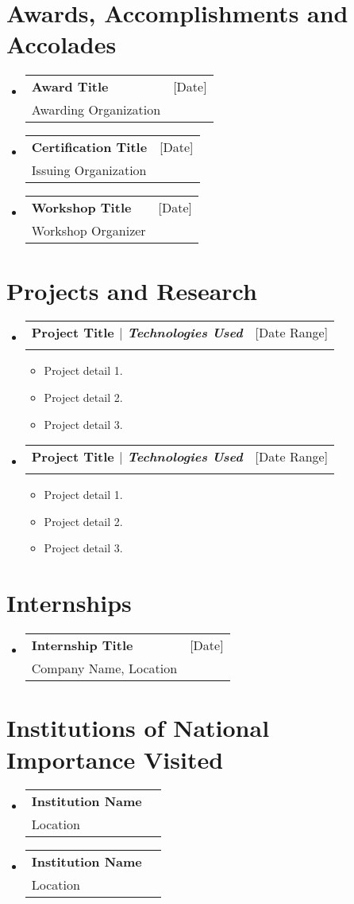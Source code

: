 \documentclass[A4,11pt]{article}
\makeatletter
\newcommand{\CVItem}[1]{
	\item\small{
		{#1 \vspace{-2pt}}
	}
}
\newcommand{\CVSubheading}[4]{
	\vspace{-2pt}\item
	\begin{tabular*}{0.97\textwidth}[t]{l@{\extracolsep{\fill}}r}
		\textbf{#1} & #2 \\
		\small#3 & \small #4 \\
	\end{tabular*}\vspace{-7pt}
}
\newcommand{\CVSubHeadingListStart}{\begin{itemize}[leftmargin=0.5cm, label={}]}
\newcommand{\CVSubHeadingListEnd}{\end{itemize}}
\newcommand{\CVItemListStart}{\begin{itemize}}
\newcommand{\CVItemListEnd}{\end{itemize}\vspace{-5pt}}
\makeatother
\begin{document}
		\section{Awards, Accomplishments and Accolades}
		\CVSubHeadingListStart
		\CVSubheading
		{Award Title}{\small [Date]}
		{Awarding Organization}{}
		\CVSubheading
		{Certification Title}{\small [Date]}
		{Issuing Organization}{}
		\CVSubheading
		{Workshop Title}{\small [Date]}
		{Workshop Organizer}{}
		\CVSubHeadingListEnd
		
		\section{Projects and Research}
		\CVSubHeadingListStart
		\CVSubheading
		{Project Title $|$ \emph{\small{Technologies Used}}}{\small [Date Range]}
		{}{}
		\vspace{-20pt}
		\CVItemListStart
			\CVItem{Project detail 1.}
			\CVItem{Project detail 2.}
			\CVItem{Project detail 3.}
		\CVItemListEnd
		
		\CVSubheading
		{Project Title $|$ \emph{\small{Technologies Used}}}{\small [Date Range]}
		{}{}
		\vspace{-20pt}
		\CVItemListStart
		\CVItem{Project detail 1.}
		\CVItem{Project detail 2.}
		\CVItem{Project detail 3.}
		\CVItemListEnd
		
		\CVSubHeadingListEnd
				
		\section{Internships}
		\CVSubHeadingListStart
		\CVSubheading
		{Internship Title}{\small [Date]}
		{Company Name, Location}{}
		\CVSubHeadingListEnd
		
		\section{Institutions of National Importance Visited}
		\CVSubHeadingListStart
		\CVSubheading
		{Institution Name}{}
		{Location}{}
		\CVSubheading
		{Institution Name}{}
		{Location}{}
		\CVSubHeadingListEnd
		
\end{document}
